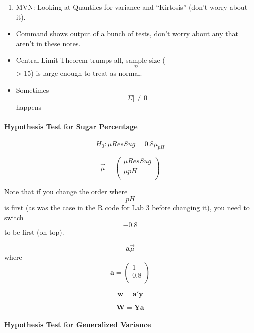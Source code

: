 \begin{enumerate}
\def\labelenumi{\arabic{enumi}.}
\setcounter{enumi}{1}
\tightlist
\item
  MVN: Looking at Quantiles for variance and ``Kirtosis'' (don't worry
  about it).
\end{enumerate}

\begin{itemize}
\tightlist
\item
  Command shows output of a bunch of tests, don't worry about any that
  aren't in these notes.
\item
  Central Limit Theorem trumps all, sample size (\[n\] \textgreater{}
  15) is large enough to treat as normal.
\item
  Sometimes \[|\Sigma| \ne 0\] happens
\end{itemize}

\hypertarget{hypothesis-test-for-sugar-percentage}{%
\paragraph{Hypothesis Test for Sugar
Percentage}\label{hypothesis-test-for-sugar-percentage}}

\[H_0: \mu{ResSug} = 0.8\mu_{pH}\]

\[\overrightarrow{\mu} = \left(\begin{array}{c} \mu{ResSug} \\ \mu{pH} \\ \end{array} \right)\]

Note that if you change the order where \[pH\] is first (as was the case
in the R code for Lab 3 before changing it), you need to switch \[-0.8\]
to be first (on top).

\[\mathbf{a}\overrightarrow{\mu}\] where
\[ \mathbf{a} = \left( \begin{array}{c} 1 \\ 0.8 \\ \end{array} \right)\]

\[\mathbf{w} = \mathbf{a'y}\]

\[\mathbf{W} = \mathbf{Ya}\]

\hypertarget{hypothesis-test-for-generalized-variance}{%
\paragraph{Hypothesis Test for Generalized
Variance}\label{hypothesis-test-for-generalized-variance}}

